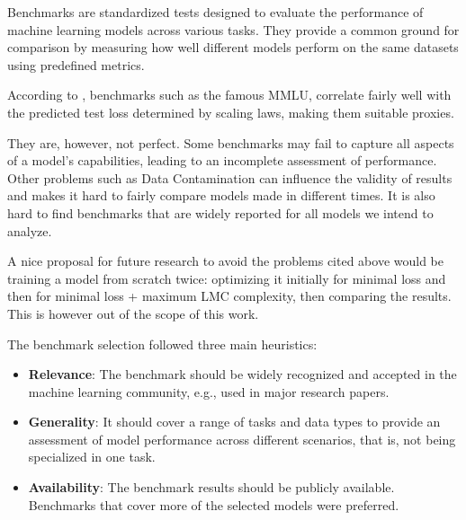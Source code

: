        Benchmarks are standardized tests designed to evaluate the performance of machine learning models across various tasks. They provide a common ground for comparison by measuring how well different models perform on the same datasets using predefined metrics. 
        
        According to \cite{Owen2024}, benchmarks such as the famous MMLU, correlate fairly well with the predicted test loss determined by scaling laws, making them suitable proxies.

        They are, however, not perfect. Some benchmarks may fail to capture all aspects of a model's capabilities, leading to an incomplete assessment of performance. Other problems such as Data Contamination \cite{Magar2022} can influence the validity of results and makes it hard to fairly compare models made in different times. It is also hard to find benchmarks that are widely reported for all models we intend to analyze.

        A nice proposal for future research to avoid the problems cited above would be training a model from scratch twice: optimizing it initially for minimal loss and then for minimal loss + maximum LMC complexity, then comparing the results. This is however out of the scope of this work.

        The benchmark selection followed three main heuristics:
        \begin{itemize}
            \item \textbf{Relevance}: The benchmark should be widely recognized and accepted in the machine learning community, e.g., used in major research papers.
            \item \textbf{Generality}: It should cover a range of tasks and data types to provide an assessment of model performance across different scenarios, that is, not being specialized in one task.
            \item \textbf{Availability}: The benchmark results should be publicly available. Benchmarks that cover more of the selected models were preferred.
        \end{itemize}

